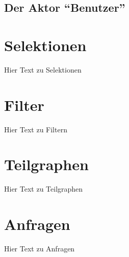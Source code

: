 %
%

\section{Der Aktor ``Benutzer''}
  




\chapter{Selektionen}
Hier Text zu Selektionen


\chapter{Filter}
Hier Text zu Filtern


\chapter{Teilgraphen}
Hier Text zu Teilgraphen


\chapter{Anfragen}
Hier Text zu Anfragen

